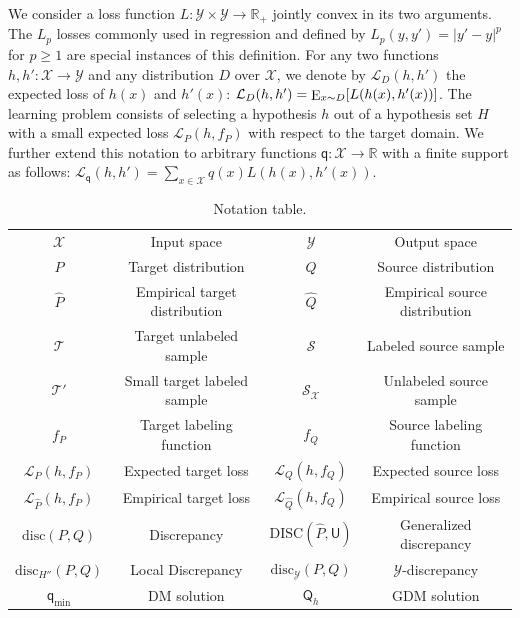 \documentclass[twoside,11pt]{article}
\def\Rset{\mathbb{R}}
\DeclareMathOperator*{\E}{\rm E}
\newcommand{\h}{\widehat}
\newcommand{\cL}{{\mathcal L}}
\newcommand{\cS}{{\mathcal S}}
\newcommand{\cT}{{\mathcal T}}
\newcommand{\cX}{{\mathcal X}}
\newcommand{\cY}{{\mathcal Y}}
\newcommand{\1}{\mat{1}}
\newcommand{\qq}{{\mathsf q}}
\newcommand{\QQ}{{\mathsf Q}}
\newcommand{\UU}{{\mathsf U}}
\newcommand{\qmin}{{\qq_\text{min}}}
\newcommand{\dis}{\mathrm{disc}}
\newcommand{\DIS}{\mathrm{DISC}}
\begin{document}
We consider a loss function $L\colon \cY \times \cY \to \Rset_+$
jointly convex in its two arguments.  The $L_p$ losses commonly used
in regression and defined by $L_p(y, y') = |y' - y|^p$ for $p \geq 1$
are special instances of this definition.  For any two functions
$h, h'\colon \cX \to \cY$ and any distribution $D$ over $\cX$, we denote
by $\cL_D(h, h')$ the expected loss of $h(x)$ and
$h'(x)$: $\cL_D(h, h') = \E_{x \sim D} [L(h(x), h'(x))]$.  The
learning problem consists of selecting a hypothesis $h$ out of a
hypothesis set $H$ with a small expected loss $\cL_P(h, f_P)$ with
respect to the target domain.  We further extend this notation to
arbitrary functions $\qq\colon \cX \to \Rset$ with a finite support as
follows:
$\cL_\qq(h, h') = \sum_{x \in \cX} q(x) L(h(x), h'(x))$.

\begin{table}[t]
\centering
\begin{tabular}{|c|c||c|c|}
\hline
$\scriptstyle{\cX}$ & \small{Input space} & $\scriptstyle{\cY}$ & \small{Output space} \\
$\scriptstyle{P}$ & \small{Target distribution} & $\scriptstyle{Q}$ & \small{Source distribution} \\
$\scriptstyle{\h P} $ & \small{Empirical target distribution} & $\scriptstyle{\h Q}$ & \small{Empirical source distribution} \\
$\scriptstyle{\cT}$ & \small{Target unlabeled sample} & $\scriptstyle{ \cS}$ & \small{Labeled source sample} \\
$\scriptstyle{\cT'}$ & \small{Small target labeled sample} & $\scriptstyle{ \cS_\cX }$ &  \small{Unlabeled source sample} \\
$\scriptstyle{f_P}$ & \small{Target labeling function} & $\scriptstyle{f_Q}$ & \small{Source labeling function} \\
$\scriptstyle{\cL_{P}(h, f_P)}$ & \small{Expected target loss} & $\scriptstyle{\cL_{Q}(h, f_Q)}$ & \small{Expected source loss} \\
$\scriptstyle{\cL_{\h P}(h, f_P)}$ & \small{Empirical target loss} & $\scriptstyle{\cL_{\h Q}(h, f_Q)}$ & \small{Empirical source loss} \\
$\scriptstyle{\dis(P, Q)}$ & \small{Discrepancy} & $\scriptstyle{\DIS(\h P, \UU) }$ & \small{Generalized discrepancy} \\
$\scriptstyle{\dis_{H''}(P, Q)}$ & \small{Local Discrepancy} & $\scriptstyle{\dis_{\cY}(P, Q) }$ & $\scriptstyle{\cY}$\small{-discrepancy} \\
$\scriptstyle{\qmin}$ & \small{DM solution} & $\scriptstyle{\QQ_h}$ & \small{GDM solution }
 \\
\hline
\end{tabular}
\caption{Notation table.}
\label{table:notation}
\end{table}
\end{document}
